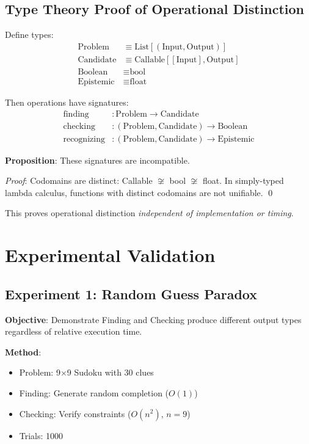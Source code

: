 \documentclass[twocolumn,aps,prl,superscriptaddress,floatfix]{revtex4-2}
\begin{document}
\subsection{Type Theory Proof of Operational Distinction}

Define types:
\begin{align}
\text{Problem} &\equiv \text{List}[(\text{Input}, \text{Output})] \\
\text{Candidate} &\equiv \text{Callable}[[\text{Input}], \text{Output}] \\
\text{Boolean} &\equiv \text{bool} \\
\text{Epistemic} &\equiv \text{float}
\end{align}

Then operations have signatures:
\begin{align}
\text{finding} &: \text{Problem} \to \text{Candidate} \\
\text{checking} &: (\text{Problem}, \text{Candidate}) \to \text{Boolean} \\
\text{recognizing} &: (\text{Problem}, \text{Candidate}) \to \text{Epistemic}
\end{align}

\textbf{Proposition}: These signatures are incompatible.

\textit{Proof}: Codomains are distinct: Callable $\not\cong$ bool $\not\cong$ float. In simply-typed lambda calculus, functions with distinct codomains are not unifiable. \qed

This proves operational distinction \emph{independent of implementation or timing}.

\section{Experimental Validation}
\label{sec:validation}

\subsection{Experiment 1: Random Guess Paradox}

\textbf{Objective}: Demonstrate Finding and Checking produce different output types regardless of relative execution time.

\textbf{Method}:
\begin{itemize}
\item Problem: 9$\times$9 Sudoku with 30 clues
\item Finding: Generate random completion ($O(1)$)
\item Checking: Verify constraints ($O(n^2)$, $n=9$)
\item Trials: 1000
\end{itemize}
\end{document}
